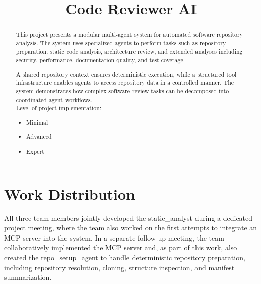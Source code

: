 \documentclass[conference]{IEEEtran}
\begin{document}
\title{Code Reviewer AI}

\author{
}

\maketitle

\begin{abstract}
	This project presents a modular multi-agent system for automated software repository analysis. The system uses specialized agents to perform tasks such as repository preparation, static code analysis, architecture review, and extended analyses including security, performance, documentation quality, and test coverage.
	
	A shared repository context ensures deterministic execution, while a structured tool infrastructure enables agents to access repository data in a controlled manner. The system demonstrates how complex software review tasks can be decomposed into coordinated agent workflows.\\
	
	Level of project implementation:
	
	\begin{itemize}
		\item[$\square$] Minimal
		\item[$\boxtimes$] Advanced
		\item[$\square$] Expert
	\end{itemize}
\end{abstract}

\section{Work Distribution}
All three team members jointly developed the static\_analyst during a dedicated project meeting, where the team also worked on the first attempts to integrate an MCP server into the system. In a separate follow-up meeting, the team collaboratively implemented the MCP server and, as part of this work, also created the repo\_setup\_agent to handle deterministic repository preparation, including repository resolution, cloning, structure inspection, and manifest summarization.
\end{document}
